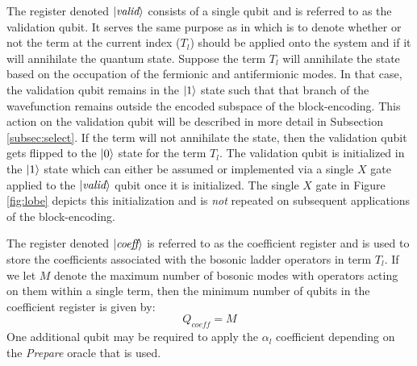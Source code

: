 The register denoted $\ket{\textit{valid}}$ consists of a single qubit and is referred to as the validation qubit.
It serves the same purpose as in \cite{liu2024efficient} which is to denote whether or not the term at the current index ($T_l$) should be applied onto the system and if it will annihilate the quantum state.
Suppose the term $T_l$ will annihilate the state based on the occupation of the fermionic and antifermionic modes. 
In that case, the validation qubit remains in the $\ket{1}$ state such that that branch of the wavefunction remains outside the encoded subspace of the block-encoding.
This action on the validation qubit will be described in more detail in Subsection \ref{subsec:select}.
If the term will not annihilate the state, then the validation qubit gets flipped to the $\ket{0}$ state for the term $T_l$.
The validation qubit is initialized in the $\ket{1}$ state which can either be assumed or implemented via a single $X$ gate applied to the $\ket{\textit{valid}}$ qubit once it is initialized.
The single $X$ gate in Figure \ref{fig:lobe} depicts this initialization and is \textit{not} repeated on subsequent applications of the block-encoding.

The register denoted $\ket{\textit{coeff}}$ is referred to as the coefficient register and is used to store the coefficients associated with the bosonic ladder operators in term $T_l$. 
If we let $M$ denote the maximum number of bosonic modes with operators acting on them within a single term, then the minimum number of qubits in the coefficient register is given by:
\begin{equation}
    Q_{\textit{coeff}} = M 
\end{equation} 
One additional qubit may be required to apply the $\alpha_l$ coefficient depending on the \textit{Prepare} oracle that is used.

